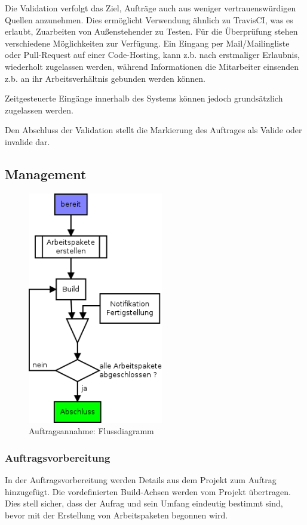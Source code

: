 Die Validation verfolgt das Ziel, Aufträge auch aus weniger vertrauenswürdigen Quellen anzunehmen.
Dies ermöglicht Verwendung ähnlich zu TravisCI, was es erlaubt, Zuarbeiten von Außenstehender zu Testen.
Für die Überprüfung stehen verschiedene Möglichkeiten zur Verfügung.
Ein Eingang per Mail/Mailingliste oder Pull-Request auf einer Code-Hosting,
kann z.b. nach erstmaliger Erlaubnis, wiederholt zugelassen werden,
während Informationen die Mitarbeiter einsenden z.b. an ihr Arbeitsverhältnis gebunden werden können.

Zeitgesteuerte Eingänge innerhalb des Systems können jedoch grundsätzlich zugelassen werden.

Den Abschluss der Validation stellt die Markierung des Auftrages als Valide oder invalide dar.

\subsection{Management}

\begin{figure}[ht] 
  \centering
  \label{fig:lebenszyklus-auftrag-abarbeitung}
  \includegraphics[height=4in]{imageinput/lebenszyklus-auftrag-abarbeitung.png}
  \caption{Auftragsannahme: Flussdiagramm}
\end{figure}

\subsubsection{Auftragsvorbereitung}

In der Auftragsvorbereitung werden Details aus dem Projekt zum Auftrag hinzugefügt.
Die vordefinierten Build-Achsen werden vom Projekt übertragen.
Dies stell sicher, dass der Aufrag und sein Umfang eindeutig bestimmt sind,
bevor mit der Erstellung von Arbeitspaketen begonnen wird.



